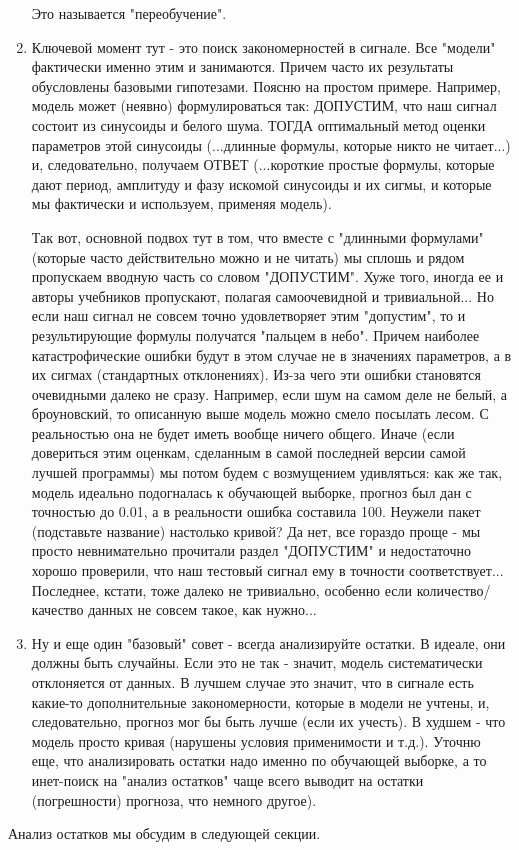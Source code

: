 \begin{enumerate}
      Это называется "переобучение".
    \item Ключевой момент тут - это поиск закономерностей в сигнале. Все
      "модели" фактически именно этим и занимаются. Причем часто их
      результаты обусловлены базовыми гипотезами. Поясню на простом
      примере. Например, модель может (неявно) формулироваться так:
      ДОПУСТИМ, что наш сигнал состоит из синусоиды и белого шума.
      ТОГДА оптимальный метод оценки параметров этой синусоиды (...длинные
      формулы, которые никто не читает...) и, следовательно, получаем
      ОТВЕТ (...короткие простые формулы, которые дают период, амплитуду и
        фазу искомой синусоиды и их сигмы, и которые мы фактически и
      используем, применяя модель).

      Так вот, основной подвох тут в том, что вместе с "длинными формулами"
      (которые часто действительно можно и не читать) мы сплошь и рядом
      пропускаем вводную часть со словом "ДОПУСТИМ". Хуже того, иногда ее и
      авторы учебников пропускают, полагая самоочевидной и тривиальной...
      Но если наш сигнал не совсем точно удовлетворяет этим "допустим", то
      и результирующие формулы получатся "пальцем в небо". Причем наиболее
      катастрофические ошибки будут в этом случае не в значениях
      параметров, а в их сигмах (стандартных отклонениях). Из-за чего эти
      ошибки становятся очевидными далеко не сразу. Например, если шум на
      самом деле не белый, а броуновский, то описанную выше модель можно
      смело посылать лесом. С реальностью она не будет иметь вообще ничего
      общего. Иначе (если довериться этим оценкам, сделанным в самой
      последней версии самой лучшей программы) мы потом будем с возмущением
      удивляться: как же так, модель идеально подогналась к обучающей
      выборке, прогноз был дан с точностью до 0.01, а в реальности ошибка
      составила 100. Неужели пакет (подставьте название) настолько кривой?
      Да нет, все гораздо проще - мы просто невнимательно прочитали раздел
      "ДОПУСТИМ" и недостаточно хорошо проверили, что наш тестовый сигнал
      ему в точности соответствует... Последнее, кстати, тоже далеко не
      тривиально, особенно если количество/качество данных не совсем такое,
      как нужно...
    \item Ну и еще один "базовый" совет - всегда анализируйте остатки. В
      идеале, они должны быть случайны. Если это не так - значит, модель
      систематически отклоняется от данных. В лучшем случае это значит, что
      в сигнале есть какие-то дополнительные закономерности, которые в
      модели не учтены, и, следовательно, прогноз мог бы быть лучше (если
      их учесть). В худшем - что модель просто кривая (нарушены условия
      применимости и т.д.). Уточню еще, что анализировать остатки надо
      именно по обучающей выборке, а то инет-поиск на "анализ остатков"
    чаще всего выводит на остатки (погрешности) прогноза, что немного другое).
\end{enumerate}

Анализ остатков мы обсудим в следующей секции.

\printbibliography[heading=subbibliography, title={Источники}]
